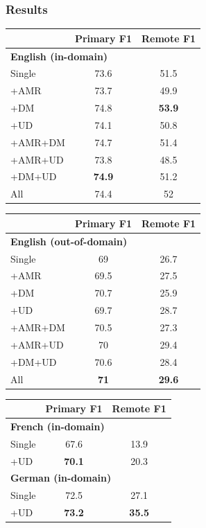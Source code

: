 \documentclass[t,xcolor={svgnames}]{beamer}
\begin{document}
\begin{frame}
\frametitle{Results}
\centering
\small
\setlength\tabcolsep{3pt}
\begin{tabular}{lcc}
& \footnotesize \bf Primary F1 & \footnotesize \bf Remote F1 \\
\hline
\multicolumn{3}{l}{\small \bf English (in-domain)} \\
\footnotesize Single
& 73.6 & 51.5 \\
\cline{1-1}
\footnotesize +AMR
& 73.7 & 49.9 \\
\footnotesize +DM
& 74.8 & \textbf{53.9} \\
\footnotesize +UD
& 74.1 & 50.8 \\
\footnotesize +AMR+DM
& 74.7 & 51.4 \\
\footnotesize +AMR+UD
& 73.8 & 48.5 \\
\footnotesize +DM+UD
& \textbf{74.9} & 51.2 \\
\footnotesize All
& 74.4 & 52
\end{tabular}
\hfill
\begin{tabular}{lcc}
& \footnotesize \bf Primary F1 & \footnotesize \bf Remote F1 \\
\hline
\multicolumn{3}{l}{\small \bf English (out-of-domain)} \\
\footnotesize Single
& 69 & 26.7 \\
\cline{1-1}
\footnotesize +AMR
& 69.5 & 27.5 \\
\footnotesize +DM
& 70.7 & 25.9 \\
\footnotesize +UD
& 69.7 & 28.7 \\
\footnotesize +AMR+DM
& 70.5 & 27.3 \\
\footnotesize +AMR+UD
& 70 & 29.4 \\
\footnotesize +DM+UD
& 70.6 & 28.4 \\
\footnotesize All
& \textbf{71} & \textbf{29.6}
\end{tabular}
\vfill
\begin{tabular}{lcc}
& \footnotesize \bf Primary F1 & \footnotesize \bf Remote F1 \\
\hline
\multicolumn{3}{l}{\small \bf French (in-domain)} \\
\small Single & 67.6 & 13.9 \\
\small +UD & \textbf{70.1} & 20.3 \\
\hline
\multicolumn{3}{l}{\small \bf German (in-domain)} \\
\small Single & 72.5 & 27.1 \\
\small +UD & \textbf{73.2} & \textbf{35.5}
\end{tabular}
\end{frame}
\end{document}
